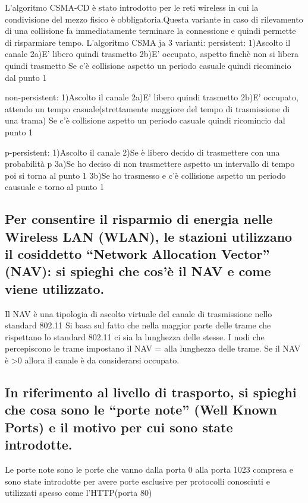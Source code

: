 \documentclass{article}
\begin{document}
    L'algoritmo CSMA-CD è stato introdotto per le reti wireless in cui la condivisione del mezzo fisico è obbligatoria.Questa variante in caso di rilevamento di una collisione fa immediatamente terminare la connessione e quindi permette di risparmiare tempo.
    L'algoritmo CSMA ja 3 varianti:
    persistent:
        1)Ascolto il canale
        2a)E' libero quindi trasmetto
        2b)E' occupato, aspetto finchè non si libera quindi trasmetto
        Se c'è collisione aspetto un periodo casuale quindi ricomincio dal punto 1
    
    non-persistent:
        1)Ascolto il canale
        2a)E' libero quindi trasmetto
        2b)E' occupato, attendo un tempo casuale(strettamente maggiore del tempo di trasmissione di una trama)
        Se c'è collisione aspetto un periodo casuale quindi ricomincio dal punto 1
        
    p-persistent:
        1)Ascolto il canale
        2)Se è libero decido di trasmettere con una probabilità p
        3a)Se ho deciso di non trasmettere aspetto un intervallo di tempo poi si torna al punto 1
        3b)Se ho trasmesso e c'è collisione aspetto un periodo causuale e torno al punto 1
    \subsection*{Per consentire il risparmio di energia nelle Wireless LAN (WLAN), le stazioni utilizzano il cosiddetto “Network Allocation Vector” (NAV): si spieghi che cos’è il NAV e come viene utilizzato.}
    
    Il NAV è una tipologia di ascolto virtuale del canale di trasmissione nello standard 802.11
    Si basa sul fatto che nella maggior parte delle trame che rispettano lo standard 802.11 ci sia la lunghezza delle stesse.
    I nodi che percepiscono le trame impostano il NAV = alla lunghezza delle trame.
    Se il NAV è >0 allora il canale è da considerarsi occupato.
    
    \subsection*{In riferimento al livello di trasporto, si spieghi che cosa sono le “porte note” (Well Known Ports) e il motivo per cui sono state introdotte.}
    
    Le porte note sono le porte che vanno dalla porta 0 alla porta 1023 compresa e sono state introdotte per avere porte esclusive per protocolli conosciuti e utilizzati spesso come l'HTTP(porta 80)
    
\end{document}
